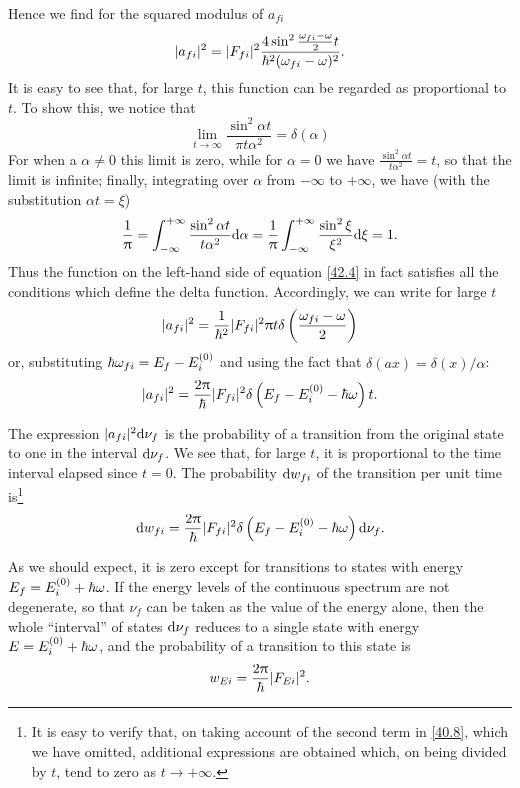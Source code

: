 Hence we find for the squared modulus of $ a_{fi} $
\begin{equation}\label{42.3}
|a_{fi}|^2=|F_{fi}|^2\frac{4\sin^2\frac{\omega_{fi}-\omega}{2}t}{\hbar^2(\omega_{fi}-\omega)^2}.
\end{equation}
It is easy to see that, for large $ t $, this function can be regarded as proportional to $ t $. To show this, we notice that
\begin{equation}\label{42.4}
\lim\limits_{t\to\infty}\frac{\sin^2\alpha t}{\pi t\alpha^2}=\delta(\alpha)
\end{equation}
For when a $ \alpha\ne  0 $ this limit is zero, while for $ \alpha= 0 $ we have $ \frac{\sin^2\alpha t}{t\alpha^2} = t $, so that the limit is infinite; finally, integrating over $\alpha$ from $-\infty$ to $ +\infty $, we have (with the substitution $ \alpha t =\xi $)
\[ \frac{1}{\uppi}=\int_{-\infty}^{+\infty}\frac{\sin^2\alpha t}{t\alpha^2}\mathrm{d}\alpha=\frac{1}{\uppi}\int_{-\infty}^{+\infty}\frac{\sin^2\xi}{\xi^2}\mathrm{d}\xi=1. \]
Thus the function on the left-hand side of equation \eqref{42.4} in fact satisfies all the conditions which define the delta function. Accordingly, we can write for large $ t $
\[ |a_{fi}|^2=\frac{1}{\hbar^2}|F_{fi}|^2\uppi t\delta\left(\frac{\omega_{fi}-\omega}{2} \right) \]
or, substituting $ \hbar\omega_{fi} = E_f - E_i^{(0)} $ and using the fact that $ \delta(ax) = \delta(x)/\alpha $:
\[ |a_{fi}|^2=\frac{2\uppi}{\hbar}|F_{fi}|^2\delta\left(E_f-E_i^{(0)}-\hbar\omega \right)t. \]


The expression $ |a_{fi}|^2 \mathrm{d}\nu_f $ is the probability of a transition from the original state to one in the interval $ \mathrm{d}\nu_f $. We see that, for large $ t $, it is proportional to the time interval elapsed since $ t = 0 $. The probability $ \mathrm{d} w_{fi} $ of the transition per unit time is\footnote{It is easy to verify that, on taking account of the second term in \eqref{40.8}, which we have omitted, additional expressions are obtained which, on being divided by $ t $, tend to zero as $ t \to+\infty $.
}
\begin{equation}\label{42.5}
\mathrm{d} w_{fi}=\frac{2\uppi}{\hbar}|F_{fi}|^2\delta\left(E_f-E_i^{(0)}-\hbar\omega \right)\mathrm{d}\nu_f.
\end{equation}


As we should expect, it is zero except for transitions to states with energy $ E_f = E_i^{(0)} + \hbar\omega $. If the energy levels of the continuous spectrum are not degenerate, so that $ \nu_f $ can be taken as the value of the energy alone, then the whole “interval” of states $ \mathrm{d}\nu_f $ reduces to a single state with energy $ E = E_i^{(0)} +  \hbar\omega $, and the probability of a transition to this state is
\begin{equation}\label{42.6}
w_{Ei}=\frac{2\uppi}{\hbar}|F_{Ei}|^2.
\end{equation}



